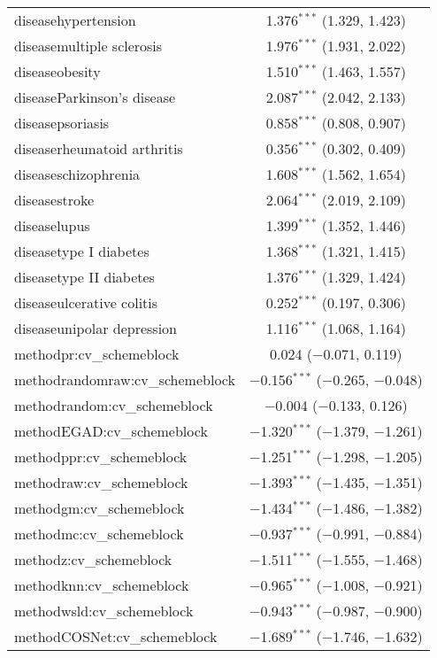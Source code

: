 \begin{table}[!htbp]
\begin{tabular}{@{\extracolsep{5pt}}lc}
  diseasehypertension & 1.376$^{***}$ (1.329, 1.423) \\ 
  diseasemultiple sclerosis & 1.976$^{***}$ (1.931, 2.022) \\ 
  diseaseobesity & 1.510$^{***}$ (1.463, 1.557) \\ 
  diseaseParkinson's disease & 2.087$^{***}$ (2.042, 2.133) \\ 
  diseasepsoriasis & 0.858$^{***}$ (0.808, 0.907) \\ 
  diseaserheumatoid arthritis & 0.356$^{***}$ (0.302, 0.409) \\ 
  diseaseschizophrenia & 1.608$^{***}$ (1.562, 1.654) \\ 
  diseasestroke & 2.064$^{***}$ (2.019, 2.109) \\ 
  diseaselupus & 1.399$^{***}$ (1.352, 1.446) \\ 
  diseasetype I diabetes & 1.368$^{***}$ (1.321, 1.415) \\ 
  diseasetype II diabetes & 1.376$^{***}$ (1.329, 1.424) \\ 
  diseaseulcerative colitis & 0.252$^{***}$ (0.197, 0.306) \\ 
  diseaseunipolar depression & 1.116$^{***}$ (1.068, 1.164) \\ 
  methodpr:cv\_schemeblock & 0.024 ($-$0.071, 0.119) \\ 
  methodrandomraw:cv\_schemeblock & $-$0.156$^{***}$ ($-$0.265, $-$0.048) \\ 
  methodrandom:cv\_schemeblock & $-$0.004 ($-$0.133, 0.126) \\ 
  methodEGAD:cv\_schemeblock & $-$1.320$^{***}$ ($-$1.379, $-$1.261) \\ 
  methodppr:cv\_schemeblock & $-$1.251$^{***}$ ($-$1.298, $-$1.205) \\ 
  methodraw:cv\_schemeblock & $-$1.393$^{***}$ ($-$1.435, $-$1.351) \\ 
  methodgm:cv\_schemeblock & $-$1.434$^{***}$ ($-$1.486, $-$1.382) \\ 
  methodmc:cv\_schemeblock & $-$0.937$^{***}$ ($-$0.991, $-$0.884) \\ 
  methodz:cv\_schemeblock & $-$1.511$^{***}$ ($-$1.555, $-$1.468) \\ 
  methodknn:cv\_schemeblock & $-$0.965$^{***}$ ($-$1.008, $-$0.921) \\ 
  methodwsld:cv\_schemeblock & $-$0.943$^{***}$ ($-$0.987, $-$0.900) \\ 
  methodCOSNet:cv\_schemeblock & $-$1.689$^{***}$ ($-$1.746, $-$1.632) \\ 

\end{tabular}
\end{table}
